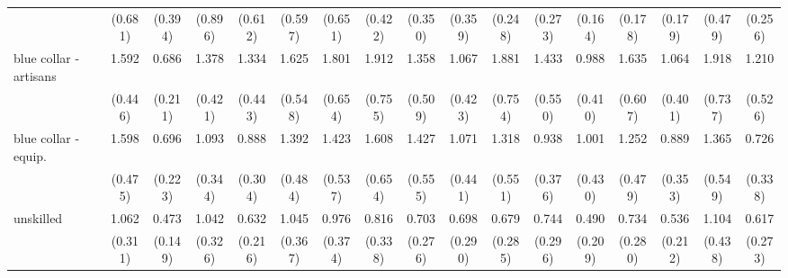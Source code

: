 {\begin{tabular}{l*{16}{c}}
                    &     (0.681)         &     (0.394)         &     (0.896)         &     (0.612)         &     (0.597)         &     (0.651)         &     (0.422)         &     (0.350)         &     (0.359)         &     (0.248)         &     (0.273)         &     (0.164)         &     (0.178)         &     (0.179)         &     (0.479)         &     (0.256)         \\
[1em]
blue collar - artisans&       1.592         &       0.686         &       1.378         &       1.334         &       1.625         &       1.801         &       1.912         &       1.358         &       1.067         &       1.881         &       1.433         &       0.988         &       1.635         &       1.064         &       1.918         &       1.210         \\
                    &     (0.446)         &     (0.211)         &     (0.421)         &     (0.443)         &     (0.548)         &     (0.654)         &     (0.755)         &     (0.509)         &     (0.423)         &     (0.754)         &     (0.550)         &     (0.410)         &     (0.607)         &     (0.401)         &     (0.737)         &     (0.526)         \\
[1em]
blue collar - equip.&       1.598         &       0.696         &       1.093         &       0.888         &       1.392         &       1.423         &       1.608         &       1.427         &       1.071         &       1.318         &       0.938         &       1.001         &       1.252         &       0.889         &       1.365         &       0.726         \\
                    &     (0.475)         &     (0.223)         &     (0.344)         &     (0.304)         &     (0.484)         &     (0.537)         &     (0.654)         &     (0.555)         &     (0.441)         &     (0.551)         &     (0.376)         &     (0.430)         &     (0.479)         &     (0.353)         &     (0.549)         &     (0.338)         \\
[1em]
unskilled           &       1.062         &       0.473\sym{*}  &       1.042         &       0.632         &       1.045         &       0.976         &       0.816         &       0.703         &       0.698         &       0.679         &       0.744         &       0.490         &       0.734         &       0.536         &       1.104         &       0.617         \\
                    &     (0.311)         &     (0.149)         &     (0.326)         &     (0.216)         &     (0.367)         &     (0.374)         &     (0.338)         &     (0.276)         &     (0.290)         &     (0.285)         &     (0.296)         &     (0.209)         &     (0.280)         &     (0.212)         &     (0.438)         &     (0.273)         \\

\end{tabular}}
